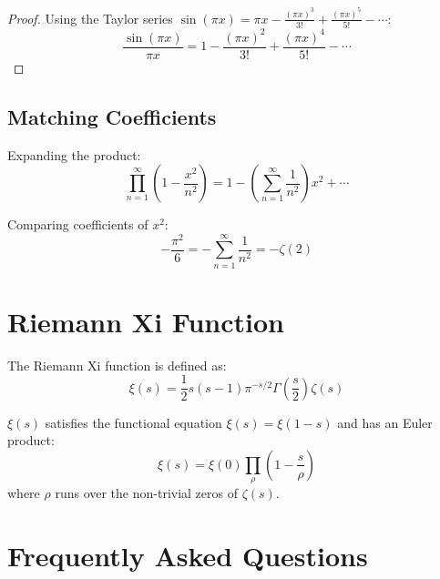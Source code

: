\begin{proof}
Using the Taylor series $\sin(\pi x) = \pi x - \frac{(\pi x)^3}{3!} + \frac{(\pi x)^5}{5!} - \cdots$:
\[
\frac{\sin(\pi x)}{\pi x} = 1 - \frac{(\pi x)^2}{3!} + \frac{(\pi x)^4}{5!} - \cdots
\]
\end{proof}

\subsection{Matching Coefficients}

Expanding the product:
\[
\prod_{n=1}^{\infty}\left(1 - \frac{x^2}{n^2}\right) = 1 - \left(\sum_{n=1}^{\infty}\frac{1}{n^2}\right)x^2 + \cdots
\]

Comparing coefficients of $x^2$:
\[
-\frac{\pi^2}{6} = -\sum_{n=1}^{\infty}\frac{1}{n^2} = -\zeta(2)
\]

\section{Riemann Xi Function}

\begin{definition}
The Riemann Xi function is defined as:
\[
\xi(s) = \frac{1}{2}s(s-1)\pi^{-s/2}\Gamma\left(\frac{s}{2}\right)\zeta(s)
\]
\end{definition}

\begin{theorem}
$\xi(s)$ satisfies the functional equation $\xi(s) = \xi(1-s)$ and has an Euler product:
\[
\xi(s) = \xi(0) \prod_{\rho} \left(1 - \frac{s}{\rho}\right)
\]
where $\rho$ runs over the non-trivial zeros of $\zeta(s)$.
\end{theorem}

\section{Frequently Asked Questions}

